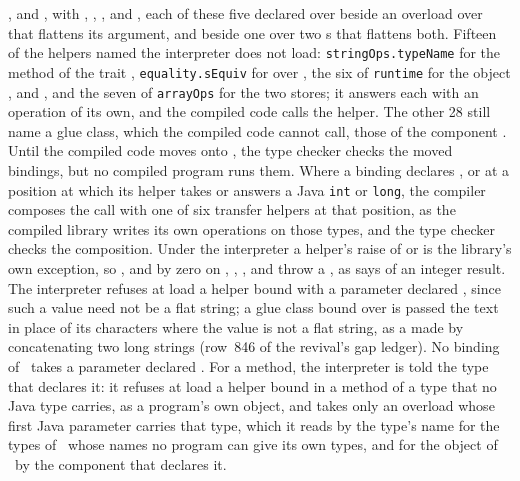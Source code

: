 \begin{description}
,  and , with ,
, ,  and
, each of these five declared over  beside an
overload over  that flattens its argument, and  beside
one over two s that flattens both.
Fifteen of the helpers named the interpreter does not load:
\texttt{stringOps.typeName} for the method  of the trait
, \texttt{equality.sEquiv} for \EXP{\sequiv} over , the
six of \texttt{runtime} for the object ,  and
, and the seven of \texttt{arrayOps} for the two stores;
it answers each with an operation of its own, and the compiled code calls the
helper.
The other 28 still name a glue class, which the compiled code cannot call,
those of the component .
Until the compiled code moves onto \library, the type checker checks the moved
bindings, but no compiled program runs them.
Where a binding declares ,  or 
at a position at which its helper takes or answers a Java \texttt{int} or
\texttt{long}, the compiler composes the call with one of six transfer helpers
at that position, as the compiled library writes its own operations on those
types, and the type checker checks the composition.
Under the interpreter a helper's raise of  or
 is the library's own exception, so \EXP{\div},  and  by zero on ,
, ,  and
 throw a , as  says
of an integer result.
The interpreter refuses at load a helper bound with a parameter declared
, since such a value need not be a flat string; a glue class bound
over  is passed the text  in place of its
characters where the value is not a flat string, as a  made by
concatenating two long strings (row~846 of the revival's gap ledger).
No binding of \library\ takes a parameter declared .
For a method, the interpreter is told the type that declares it: it refuses at
load a helper bound in a method of a type that no Java type carries, as a
program's own object, and takes only an overload whose first Java parameter
carries that type, which it reads by the type's name for the types of
\library\ whose names no program can give its own types, and for the object
 of \library\ by the component that declares it.

\end{description}
